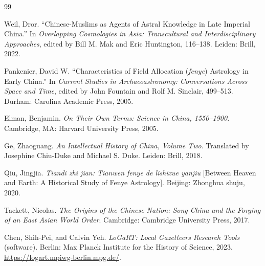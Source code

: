 \documentclass[12pt]{article}
\begin{document}
\begin{thebibliography}{99}
\setlength{\itemsep}{0.6em}

 Weil, Dror. ``Chinese-Muslims as Agents of Astral Knowledge in Late Imperial China.'' In \emph{Overlapping Cosmologies in Asia: Transcultural and Interdisciplinary Approaches}, edited by Bill M. Mak and Eric Huntington, 116--138. Leiden: Brill, 2022.

 Pankenier, David W. ``Characteristics of Field Allocation (\emph{fenye}) Astrology in Early China.'' In \emph{Current Studies in Archaeoastronomy: Conversations Across Space and Time}, edited by John Fountain and Rolf M. Sinclair, 499--513. Durham: Carolina Academic Press, 2005.

 Elman, Benjamin. \emph{On Their Own Terms: Science in China, 1550--1900}. Cambridge, MA: Harvard University Press, 2005.

 Ge, Zhaoguang. \emph{An Intellectual History of China, Volume Two}. Translated by Josephine Chiu-Duke and Michael S. Duke. Leiden: Brill, 2018.

 Qiu, Jingjia. \emph{Tiandi zhi jian: Tianwen fenye de lishixue yanjiu} [Between Heaven and Earth: A Historical Study of Fenye Astrology]. Beijing: Zhonghua shuju, 2020.

 Tackett, Nicolas. \emph{The Origins of the Chinese Nation: Song China and the Forging of an East Asian World Order}. Cambridge: Cambridge University Press, 2017.

 Chen, Shih-Pei, and Calvin Yeh. \emph{LoGaRT: Local Gazetteers Research Tools} (software). Berlin: Max Planck Institute for the History of Science, 2023. \url{https://logart.mpiwg-berlin.mpg.de/}.

\end{thebibliography}
\end{document}
